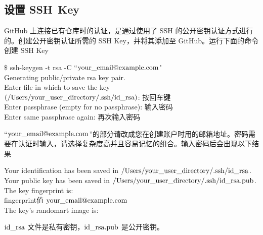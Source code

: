 \documentclass[12pt,a4paper]{article}
\begin{document}
\subsection{设置 SSH Key}
GitHub 上连接已有仓库时的认证，是通过使用了 SSH 的公开密钥认证方式进行的。创建公开密钥认证所需的 SSH Key，并将其添加至 GitHub。运行下面的命令创建 SSH Key
\begin{tcolorbox}[colback=green!5,colframe=green!40!black,title= ]
$\$$ ssh-keygen -t rsa -C ``$\rm your\_email@example.com$" \\
Generating public/private rsa key pair. \\
Enter file in which to save the key \\
$\rm (/Users/your\_user\_directory/.ssh/id\_rsa)$: 按回车键 \\
Enter passphrase (empty for no passphrase): 输入密码 \\
Enter same passphrase again: 再次输入密码
\end{tcolorbox}
``$\rm your\_email@example.com$”的部分请改成您在创建账户时用的邮箱地址。密码需要在认证时输入，请选择复杂度高并且容易记忆的组合。输入密码后会出现以下结果
\begin{tcolorbox}[colback=green!5,colframe=green!40!black,title= ]
Your identification has been saved in $\rm /Users/your\_user\_directory/.ssh/id\_rsa$. \\
Your public key has been saved in $\rm /Users/your\_user\_directory/.ssh/id\_rsa.pub$. \\
The key fingerprint is: \\
fingerprint值 $\rm your\_email@example.com$ \\
The key's randomart image is:
\end{tcolorbox}
$\rm id\_rsa$ 文件是私有密钥，$\rm id\_rsa.pub$ 是公开密钥。
\end{document}
